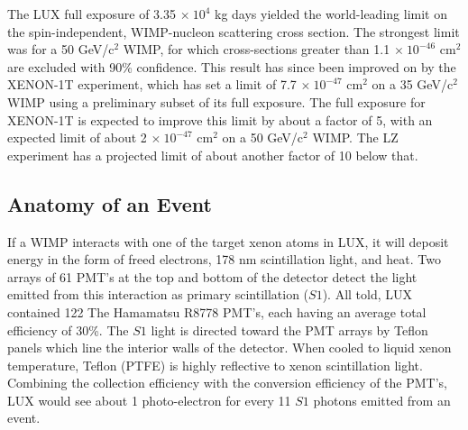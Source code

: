 The LUX full exposure of 3.35 $\times \ 10^4$ kg days yielded the world-leading limit on the spin-independent, WIMP-nucleon scattering cross section. The strongest limit was for a 50 GeV/c$^2$ WIMP, for which cross-sections greater than 1.1 $\times \ 10^{-46}$ cm$^2$ are excluded with 90\% confidence. This result has since been improved on by the XENON-1T experiment, which has set a limit of 7.7 $\times \ 10^{-47}$ cm$^2$ on a 35 GeV/c$^2$ WIMP using a preliminary subset of its full exposure. The full exposure for XENON-1T is expected to improve this limit by about a factor of 5, with an expected limit of about 2 $\times \ 10^{-47}$ cm$^2$ on a 50 GeV/c$^2$ WIMP. The LZ experiment has a projected limit of about another factor of 10 below that.


\subsection{Anatomy of an Event}
If a WIMP interacts with one of the target xenon atoms in LUX, it will deposit energy in the form of freed electrons, 178 nm scintillation light, and heat. Two arrays of 61 PMT's at the top and bottom of the detector detect the light emitted from this interaction as primary scintillation ($S1$). All told, LUX contained 122 The Hamamatsu R8778 PMT's, each having an average total efficiency of 30\%. The $S1$ light is directed toward the PMT arrays by Teflon panels which line the interior walls of the detector. When cooled to liquid xenon temperature, Teflon (PTFE) is highly reflective to xenon scintillation light\cite{ptfe_ref}. Combining the collection efficiency with the conversion efficiency of the PMT's, LUX would see about 1 photo-electron for every 11 $S1$ photons emitted from an event.
